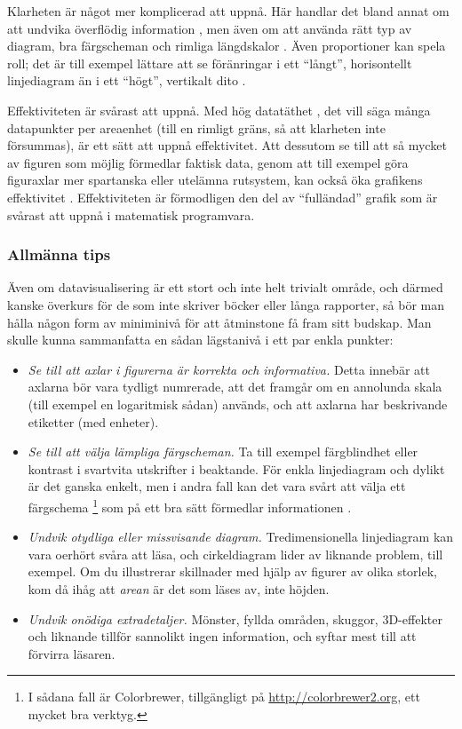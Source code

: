 \documentclass[10pt,../../a4.tex]{subfiles}
\begin{document}
Klarheten är något mer komplicerad att uppnå. Här handlar det bland annat
om att undvika överflödig information , men även om att
använda rätt typ av diagram, bra färgscheman
\parencite[\ppno~75–77]{Tufte97} och rimliga längdskalor
\parencite[\ppno~20–23]{Tufte97}. Även proportioner kan spela roll;
det är till exempel lättare att se föränringar i ett \enquote{långt},
horisontellt linjediagram än i ett \enquote{högt}, vertikalt dito
\parencite[\ppno~186\psq]{Tufte01}.

Effektiviteten är svårast att uppnå. Med hög datatäthet
\parencite[\pno~162]{Tufte01}, det vill säga många datapunkter per
areaenhet (till en rimligt gräns, så att klarheten inte försummas), är
ett sätt att uppnå effektivitet. Att dessutom se till att så mycket av figuren som möjlig förmedlar faktisk data, genom att till exempel göra
figuraxlar mer spartanska eller utelämna rutsystem, kan också öka
grafikens effektivitet \parencite[\ppno~123\psqq]{Tufte01}. 
Effektiviteten är förmodligen den del av \enquote{fulländad} grafik
som är svårast att uppnå i matematisk programvara.

\subsubsection{Allmänna tips}
Även om datavisualisering är ett stort och inte helt trivialt område, 
och därmed kanske överkurs för de som inte skriver böcker eller långa
rapporter, så bör man hålla någon form av miniminivå för att åtminstone
få fram sitt budskap. Man skulle kunna sammanfatta en sådan lägstanivå
i ett par enkla punkter:
\begin{itemize}
	\item \emph{Se till att axlar i figurerna är korrekta och
		informativa.} Detta innebär att axlarna bör vara tydligt
		numrerade, att det framgår om en annolunda skala (till exempel en
		logaritmisk sådan) används, och att axlarna har beskrivande
		etiketter (med enheter).
	\item \emph{Se till att välja lämpliga färgscheman.} Ta till exempel
		färgblindhet eller kontrast i svartvita utskrifter i beaktande.
		För enkla linjediagram och dylikt är det ganska enkelt, men i
		andra fall kan det vara svårt att välja ett färgschema%
		\footnote{I sådana fall är Colorbrewer, tillgängligt på 
		\url{http://colorbrewer2.org}, ett mycket bra verktyg.} som på
		ett bra sätt förmedlar informationen
		\parencite{Borland07,Moreland09a}.
	\item \emph{Undvik otydliga eller missvisande diagram.}
		Tredimensionella linjediagram kan vara oerhört svåra att läsa,
		och cirkeldiagram lider av liknande problem, till exempel. Om
		du illustrerar skillnader med hjälp av figurer av olika storlek,
		kom då ihåg att \emph{arean} är det som läses av, inte höjden.
	\item \emph{Undvik onödiga extradetaljer.} Mönster, fyllda områden,
		skuggor, 3D-effekter och liknande tillför sannolikt ingen
		information, och syftar mest till att förvirra läsaren.
\end{itemize}
\end{document}
